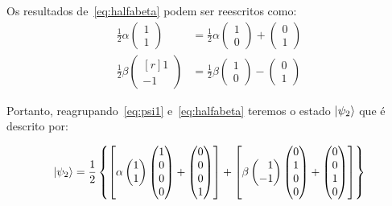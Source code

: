 Os resultados de~\eqref{eq:halfabeta} podem ser reescritos como:
\begin{equation} \label{eq:alfabetasoma}
  \begin{split}
\frac{1}{2} \alpha \begin{pmatrix}
1 \\
1 
\end{pmatrix} &= \frac{1}{2} \alpha \begin{pmatrix}
1 \\
0 
\end{pmatrix} + \begin{pmatrix}
0 \\
1 
\end{pmatrix} \\
\frac{1}{2} \beta \begin{pmatrix*}[r]
1 \\
-1
\end{pmatrix*} &= \frac{1}{2} \beta \begin{pmatrix}
1 \\
0
\end{pmatrix} - \begin{pmatrix}
0 \\
1
\end{pmatrix} 
  \end{split}
\end{equation}

Portanto, reagrupando~\eqref{eq:psi1} e~\eqref{eq:halfabeta} teremos o estado $\ket{\psi_2}$ que é descrito por:

\begin{align}\label{eq:psi2matrix}
\ket{\psi_2} = \frac{1}{2} \left\{\left[ \alpha \begin{pmatrix}
1 \\
1 
\end{pmatrix} \begin{pmatrix}
1 \\
0 \\
0 \\
0
\end{pmatrix} +\begin{pmatrix}
0 \\
0 \\
0 \\
1
\end{pmatrix} \right] + \left[\beta \begin{pmatrix*}[r]
1 \\
-1
\end{pmatrix*} \begin{pmatrix}
0 \\
1 \\
0 \\
0
\end{pmatrix} + \begin{pmatrix}
0 \\
0 \\
1 \\
0
\end{pmatrix}\right]\right\}
\end{align}



